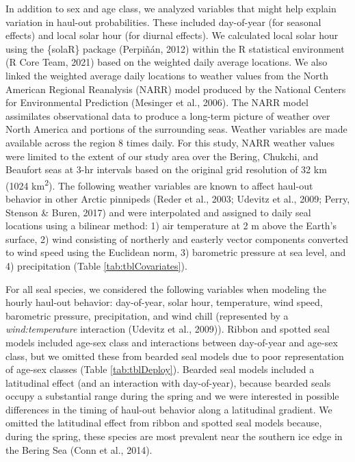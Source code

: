 \documentclass[fleqn,10pt,lineno]{wlpeerj} %
\begin{document}
In addition to sex and age class, we analyzed variables that might help explain
variation in haul-out probabilities. These included day-of-year (for seasonal
effects) and local solar hour (for diurnal effects). We calculated local solar
hour using the \{solaR\} package (Perpiñán, 2012) within the R statistical
environment (R Core Team, 2021) based on the weighted daily average locations. We
also linked the weighted average daily locations to weather values from the
North American Regional Reanalysis (NARR) model produced by the National Centers
for Environmental Prediction (Mesinger et al., 2006). The NARR model assimilates
observational data to produce a long-term picture of weather over North America
and portions of the surrounding seas. Weather variables are made available
across the region 8 times daily. For this study, NARR weather values were limited
to the extent of our study area over the Bering, Chukchi, and Beaufort seas at 3-hr
intervals based on the original grid resolution of 32 km (1024 km\textsuperscript{2}). The
following weather variables are known to affect haul-out behavior in
other Arctic pinnipeds (Reder et al., 2003; Udevitz et al., 2009; Perry, Stenson \& Buren, 2017) and were
interpolated and assigned to daily seal locations using a bilinear method: 1)
air temperature at 2 m above the Earth's surface, 2) wind consisting of
northerly and easterly vector components converted to wind speed using the
Euclidean norm, 3) barometric pressure at sea level, and 4) precipitation
(Table \ref{tab:tblCovariates}).

For all seal species, we considered the following variables when modeling the
hourly haul-out behavior: day-of-year, solar hour, temperature, wind speed,
barometric pressure, precipitation, and wind chill (represented by a
\emph{wind:temperature} interaction (Udevitz et al., 2009)). Ribbon and spotted seal models
included age-sex class and interactions between day-of-year and age-sex class,
but we omitted these from bearded seal models due to poor representation of
age-sex classes (Table \ref{tab:tblDeploy}). Bearded seal models included a
latitudinal effect (and an interaction with day-of-year), because bearded seals
occupy a substantial range during the spring and we were interested in possible
differences in the timing of haul-out behavior along a latitudinal gradient. We
omitted the latitudinal effect from ribbon and spotted seal models because,
during the spring, these species are most prevalent near the southern ice edge
in the Bering Sea (Conn et al., 2014).
\end{document}
